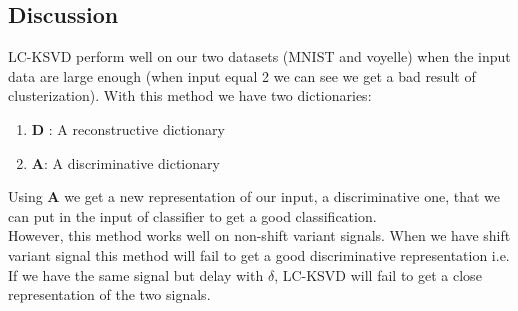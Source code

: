 \subsection{Discussion}
LC-KSVD perform well on our two datasets (MNIST and voyelle) when the input data are large enough (when input equal 2 we can see we get a bad result of clusterization). With this method we have two dictionaries: 
\begin{enumerate}
 \item \textbf{D} : A reconstructive dictionary
 \item \textbf{A}: A discriminative dictionary
\end{enumerate}
Using \textbf{A} we get a new representation of our input, a discriminative one, that we can put in the input of classifier to get a good classification.\\
However, this method works well on non-shift variant signals. When we have shift variant signal this method will fail to get a good discriminative representation i.e. If we have the same signal but delay with $\delta$, LC-KSVD will fail to get a close representation of the two signals.
